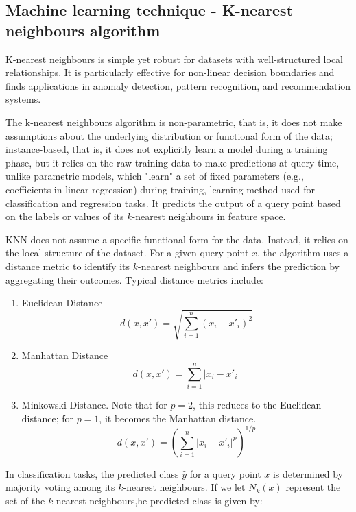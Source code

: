 	
	\bigskip
	\subsection{Machine learning technique - K-nearest neighbours algorithm}
	
	K-nearest neighbours\cite{geron2022hands} is simple yet robust for datasets with well-structured local relationships. It is particularly effective for non-linear decision boundaries and finds applications in anomaly detection, pattern recognition, and recommendation systems.
	
	The k-nearest neighbours algorithm is non-parametric, that is, it does not make assumptions about the underlying distribution or functional form of the data; instance-based, that is, it does not explicitly learn a model during a training phase, but it relies on the raw training data to make predictions at query time, unlike parametric models, which "learn" a set of fixed parameters (e.g., coefficients in linear regression) during training,   learning method used for classification and regression tasks. It predicts the output of a query point based on the labels or values of its $k$-nearest neighbours in feature space.
	
	KNN does not assume a specific functional form for the data. Instead, it relies on the local structure of the dataset. For a given query point $x$, the algorithm uses a distance metric to identify its $k$-nearest neighbours and infers the prediction by aggregating their outcomes. Typical distance metrics include:
	\begin{enumerate}
		\item Euclidean Distance
		$$
		d(x, x') = \sqrt{\sum_{i=1}^{n} (x_i - x'_i)^2}
		$$
		
		\item Manhattan Distance
		$$
		d(x, x') = \sum_{i=1}^{n} |x_i - x'_i|
		$$
		
		\item Minkowski Distance. Note that for $p = 2$, this reduces to the Euclidean distance; for $p = 1$, it becomes the Manhattan distance.
			$$
			d(x, x') = \left( \sum_{i=1}^{n} |x_i - x'_i|^p \right)^{1/p}
			$$
		\end{enumerate}
		
		
		In classification tasks, the predicted class  $\hat{y}$ for a query point $x$ is determined by majority voting among its  $k$-nearest neighbours. If we let $N_k(x)$ represent the set of the $k$-nearest neighbours,he predicted class is given by:
		

